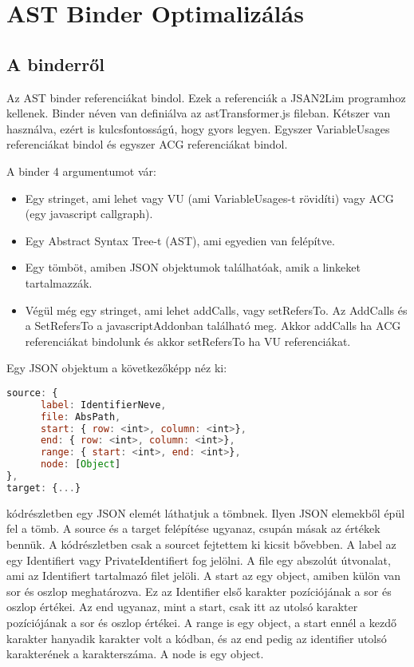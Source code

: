 \chapter{AST Binder Optimalizálás}\label{chap:AST Binder Optimalizálás}

\section{A binderről}

\noindent

Az AST binder referenciákat bindol. Ezek a referenciák a JSAN2Lim programhoz kellenek.
Binder néven van definiálva az astTransformer.js fileban.
Kétszer van használva, ezért is kulcsfontosságú, hogy gyors legyen.
Egyszer VariableUsages referenciákat bindol és egyszer ACG referenciákat bindol.
\noindent

A binder 4 argumentumot vár:
\begin{itemize}
      \item Egy stringet, ami lehet vagy VU (ami VariableUsages-t rövidíti) vagy ACG (egy javascript callgraph).
      \item Egy Abstract Syntax Tree-t (AST), ami egyedien van felépítve.
      \item Egy tömböt, amiben JSON objektumok találhatóak, amik a linkeket tartalmazzák.
      \item Végül még egy stringet, ami lehet addCalls, vagy setRefersTo. Az AddCalls és a SetRefersTo a javascriptAddonban található meg. Akkor addCalls ha ACG referenciákat bindolunk és akkor setRefersTo ha VU referenciákat.
\end{itemize}

Egy JSON objektum a következőképp néz ki:
\begin{lstlisting}[caption={Binder JSON argumentuma}, label={lst:binder_json_arg}, language={JavaScript}]
source: {
      label: IdentifierNeve,
      file: AbsPath,
      start: { row: <int>, column: <int>},
      end: { row: <int>, column: <int>},
      range: { start: <int>, end: <int>},
      node: [Object]
},
target: {...}
\end{lstlisting}

\noindent

 kódrészletben egy JSON elemét láthatjuk a tömbnek. Ilyen JSON elemekből épül fel a tömb.
A source és a target felépítése ugyanaz, csupán másak az értékek bennük.
A kódrészletben csak a sourcet fejtettem ki kicsit bővebben. A label az egy Identifiert vagy PrivateIdentifiert fog jelölni.
A file egy abszolút útvonalat, ami az Identifiert tartalmazó filet jelöli.
A start az egy object, amiben külön van sor és oszlop meghatározva. Ez az Identifier első karakter pozíciójának a sor és oszlop értékei.
Az end ugyanaz, mint a start, csak itt az utolsó karakter pozíciójának a sor és oszlop értékei.
A range is egy object, a start ennél a kezdő karakter hanyadik karakter volt a kódban, és az end pedig az identifier utolsó karakterének a karakterszáma.
A node is egy object.

